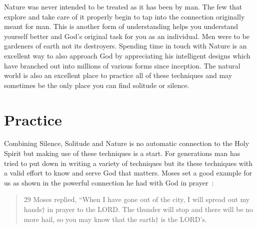 \documentclass[11pt,a4paper]{scrartcl} %
\begin{document}
\begin{doublespace}
Nature was never intended to be treated as it has been by man. The few that explore and take care of it properly begin to tap into the connection originally meant for man. This is another form of understanding helps you understand yourself better and God's original task for you as an individual. Men were to be gardeners of earth not its destroyers. Spending time in touch with Nature is an excellent way to also approach God by appreciating his intelligent designs which have branched out into millions of various forms since inception. The natural world is also an excellent place to practice all of these techniques and may sometimes be the only place you can find solitude or silence. 
\section{Practice}
Combining Silence, Solitude and Nature is no automatic connection to the Holy Spirit but making use of these techniques is a start. For generations man has tried to put down in writing a variety of techniques but its these techniques with a valid effort to know and serve God that matters. Moses set a good example for us as shown in the powerful connection he had with God in prayer~\cite{niv}:
\begin{verse}
29 Moses replied, “When I have gone out of the city, I will spread out my hands† in prayer to the LORD. The thunder will stop and there will be no more hail, so you may know that the earth† is the LORD’s. 
\end{verse} 
\end{doublespace}
\clearpage
    \nocite{*}
    
    
\end{document}
